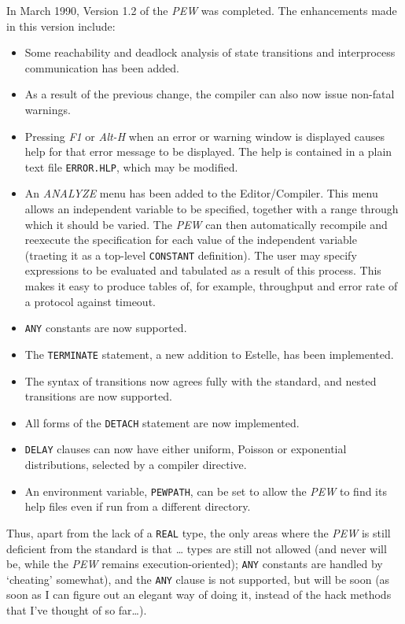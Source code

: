 In March 1990, Version 1.2 of the {\em PEW} was completed. The
enhancements made in this version include:
\begin{itemize}
\item Some reachability and deadlock analysis of state transitions and
interprocess communication has been added.
\item As a result of the previous change, the compiler can also now
issue non-fatal warnings.
\item Pressing {\em F1} or {\em Alt-H} when an error or warning
window is displayed causes help for that error message to be
displayed. The help is contained in a plain text file {\tt ERROR.HLP}, 
which may be modified.
\item An {\em ANALYZE} menu has been added to the Editor/Compiler.
This menu allows an independent variable to be specified, together
with a range through which it should be varied. The {\em PEW} can
then automatically recompile and reexecute the specification for each
value of the independent variable (traeting it as a top-level
{\tt CONSTANT} definition). The user may specify expressions
to be evaluated and tabulated as a result of this process. This makes
it easy to produce tables of, for example, throughput and error rate
of a protocol against timeout.
\item {\tt ANY} constants are now supported.
\item The {\tt TERMINATE} statement, a new addition to Estelle, 
has been implemented.
\item The syntax of transitions now agrees fully with the standard, and
nested transitions are now supported.
\item All forms of the {\tt DETACH} statement are now implemented.
\item {\tt DELAY} clauses can now have either uniform, Poisson or
exponential distributions, selected by a compiler directive.
\item An environment variable, {\tt PEWPATH}, can be set to allow the {\em
PEW} to find its help files even if run from a different directory.
\end{itemize}

Thus, apart from the lack of a {\tt REAL} type, the only areas where
the {\em PEW} is still deficient from the standard is that \dots
types are still not allowed (and never will be, while the {\em PEW}
remains execution-oriented); {\tt ANY} constants are handled by
`cheating' somewhat), and the {\tt ANY} clause is not supported, but
will be soon (as soon as I can figure out an elegant way of doing it,
instead of the hack methods that I've thought of so far\dots).

